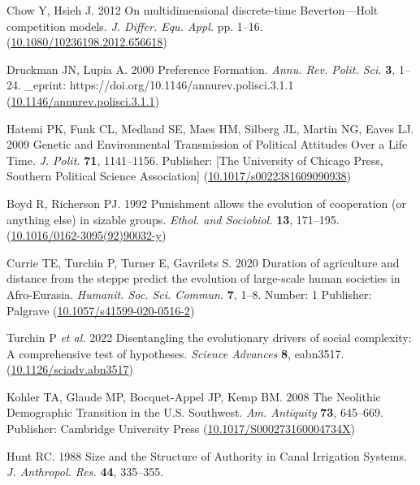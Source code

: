 \documentclass{rstb}
\begin{document}
\begin{thebibliography}{99}
Chow Y, Hsieh J. 2012  On multidimensional {discrete-time} {Beverton---Holt}
  competition models. {\em J. Differ. Equ. Appl.}
  pp. 1--16.
(\href{http://dx.doi.org/10.1080/10236198.2012.656618}{10.1080/10236198.2012.656618})

Druckman JN, Lupia A. 2000  Preference {Formation}. {\em Annu. Rev. Polit. Sci.} \textbf{3}, 1--24.
\_eprint: https://doi.org/10.1146/annurev.polisci.3.1.1
  (\href{http://dx.doi.org/10.1146/annurev.polisci.3.1.1}{10.1146/annurev.polisci.3.1.1})

Hatemi PK, Funk CL, Medland SE, Maes HM, Silberg JL, Martin NG, Eaves LJ. 2009
  Genetic and {Environmental} {Transmission} of {Political} {Attitudes} {Over}
  a {Life} {Time}. {\em J. Polit.} \textbf{71}, 1141--1156.
Publisher: [The University of Chicago Press, Southern Political Science
  Association]
  (\href{http://dx.doi.org/10.1017/s0022381609090938}{10.1017/s0022381609090938})

Boyd R, Richerson PJ. 1992  Punishment allows the evolution of cooperation (or
  anything else) in sizable groups. {\em Ethol. and Sociobiol.}
  \textbf{13}, 171--195.
(\href{http://dx.doi.org/10.1016/0162-3095(92)90032-y}{10.1016/0162-3095(92)90032-y})

Currie TE, Turchin P, Turner E, Gavrilets S. 2020  Duration of agriculture and
  distance from the steppe predict the evolution of large-scale human societies
  in {Afro}-{Eurasia}. {\em Humanit. Soc. Sci. Commun.} \textbf{7}, 1--8.
Number: 1 Publisher: Palgrave
  (\href{http://dx.doi.org/10.1057/s41599-020-0516-2}{10.1057/s41599-020-0516-2})

Turchin P \textit{et al.} 2022  Disentangling the
  evolutionary drivers of social complexity: {A} comprehensive test of
  hypotheses. {\em Science Advances} \textbf{8}, eabn3517.
  (\href{http://dx.doi.org/10.1126/sciadv.abn3517}{10.1126/sciadv.abn3517})

Kohler TA, Glaude MP, Bocquet-Appel JP, Kemp BM. 2008  The {Neolithic}
  {Demographic} {Transition} in the {U}.{S}. {Southwest}. {\em Am.
  Antiquity} \textbf{73}, 645--669.
Publisher: Cambridge University Press
  (\href{http://dx.doi.org/10.1017/S000273160004734X}{10.1017/S000273160004734X})

Hunt RC. 1988  Size and the Structure of Authority in Canal Irrigation Systems.
  {\em J. Anthropol. Res.} \textbf{44}, 335--355.


\end{thebibliography}
\end{document}
